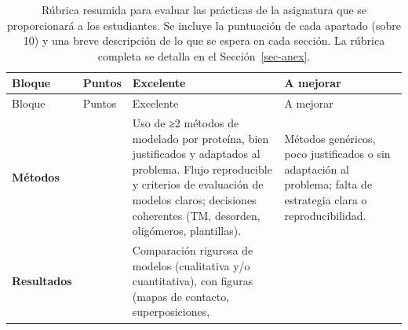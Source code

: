 \documentclass[
  11pt,
  a4paper,
  twoside]{scrreprt}
\begin{document}
\begin{longtable}[]{@{}
  >{\raggedright\arraybackslash}p{}
  >{\raggedright\arraybackslash}p{}
  >{\raggedright\arraybackslash}p{}
  >{\raggedright\arraybackslash}p{}@{}}
\caption{Rúbrica resumida para evaluar las prácticas de la asignatura
que se proporcionará a los estudiantes. Se incluye la puntuación de cada
apartado (sobre 10) y una breve descripción de lo que se espera en cada
sección. La rúbrica completa se detalla en el
Sección~\ref{sec-anex}.}\label{tbl-rubrica}\tabularnewline
\toprule\noalign{}
\begin{minipage}[b]{\linewidth}\raggedright
Bloque
\end{minipage} & \begin{minipage}[b]{\linewidth}\raggedright
Puntos
\end{minipage} & \begin{minipage}[b]{\linewidth}\raggedright
Excelente
\end{minipage} & \begin{minipage}[b]{\linewidth}\raggedright
A mejorar
\end{minipage} \\
\midrule\noalign{}
\endfirsthead
\toprule\noalign{}
\begin{minipage}[b]{\linewidth}\raggedright
Bloque
\end{minipage} & \begin{minipage}[b]{\linewidth}\raggedright
Puntos
\end{minipage} & \begin{minipage}[b]{\linewidth}\raggedright
Excelente
\end{minipage} & \begin{minipage}[b]{\linewidth}\raggedright
A mejorar
\end{minipage} \\
\midrule\noalign{}
\endhead
\bottomrule\noalign{}
\endlastfoot
\textbf{Métodos} & 2.0 & Uso de ≥2 métodos de modelado por proteína,
bien justificados y adaptados al problema. Flujo reproducible y
criterios de evaluación de modelos claros; decisiones coherentes (TM,
desorden, oligómeros, plantillas). & Métodos genéricos, poco
justificados o sin adaptación al problema; falta de estrategia clara o
reproducibilidad. \\
\textbf{Resultados} & 3.5 & Comparación rigurosa de modelos (cualitativa
y/o cuantitativa), con figuras (mapas de contacto, superposiciones,

\end{longtable}
\end{document}
